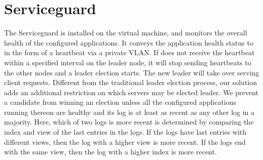 \section{Serviceguard} \label{sec:guard}

The Serviceguard is installed on the virtual machine, and monitors the overall health of 
the configured applications. It conveys the application health status to \smrsystem in the 
form of a heartbeat via a private VLAN. If \smrsystem does not receive the heartbeat within 
a specified interval on the leader node, it will stop sending heartbeats to the other nodes  
and a leader election starts. The new leader will take over serving client requests. Different 
from the traditional \paxos leader election process, our solution adds an additional restriction 
on which servers may be elected leader. We prevent a candidate from winning an election unless 
all the configured applications running thereon are healthy and its log is at least as recent as
any other log in a majority. Here, which of two logs is more recent is determined by comparing 
the index and view of the last entries in the logs. If the logs have last entries with different 
views, then the log with a higher view is more recent. If the logs end with the same view, then 
the log with a higher index is more recent. 
